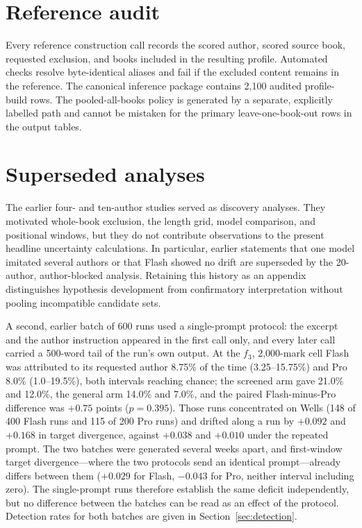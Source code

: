 \documentclass[11pt]{article}
\newcommand{\fThree}{\ensuremath{f_3}\xspace}
\begin{document}
\section{Reference audit}
\label{app:audit}

Every reference construction call records the scored author, scored source
book, requested exclusion, and books included in the resulting profile.
Automated checks resolve byte-identical aliases and fail if the excluded
content remains in the reference.  The canonical inference package contains
2,100 audited profile-build rows.  The pooled-all-books policy is generated by
a separate, explicitly labelled path and cannot be mistaken for the primary
leave-one-book-out rows in the output tables.

\section{Superseded analyses}
\label{app:superseded}

The earlier four- and ten-author studies served as discovery analyses.  They
motivated whole-book exclusion, the length grid, model comparison, and
positional windows, but they do not contribute observations to the present
headline uncertainty calculations.  In particular, earlier statements that
one model imitated several authors or that Flash showed no drift are
superseded by the 20-author, author-blocked analysis.  Retaining this history
as an appendix distinguishes hypothesis development from confirmatory
interpretation without pooling incompatible candidate sets.

A second, earlier batch of 600 runs used a single-prompt protocol: the
excerpt and the author instruction appeared in the first call only, and
every later call carried a 500-word tail of the run's own output.  At the
\fThree, 2,000-mark cell Flash was attributed to its requested author
8.75\% of the time (3.25--15.75\%) and Pro 8.0\% (1.0--19.5\%), both
intervals reaching chance; the screened arm gave 21.0\% and 12.0\%, the
general arm 14.0\% and 7.0\%, and the paired Flash-minus-Pro difference
was \(+0.75\) points (\(p=0.395\)).  Those runs concentrated on Wells
(148 of 400 Flash runs and 115 of 200 Pro runs) and drifted along a run
by \(+0.092\) and \(+0.168\) in target divergence, against \(+0.038\)
and \(+0.010\) under the repeated prompt.  The two batches were generated
several weeks apart, and first-window target divergence---where the two
protocols send an identical prompt---already differs between them
(\(+0.029\) for Flash, \(-0.043\) for Pro, neither interval including
zero).  The single-prompt runs therefore establish the same deficit
independently, but no difference between the batches can be read as an
effect of the protocol.  Detection rates for both batches are given in
Section~\ref{sec:detection}.
\end{document}
